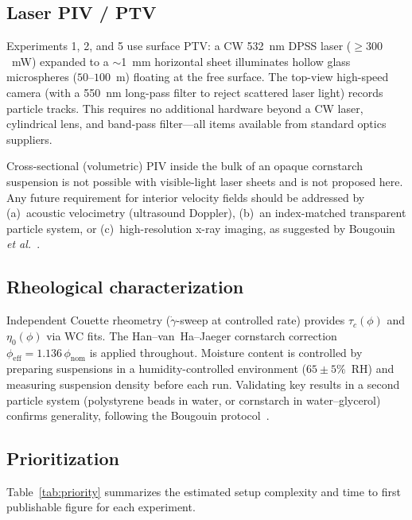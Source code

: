 \documentclass[aps,preprint,superscriptaddress,longbibliography]{revtex4-2}
\newcommand{\tauc}{\tau_c}
\newcommand{\etaz}{\eta_0}
\begin{document}
\subsection{Laser PIV / PTV}

Experiments 1, 2, and 5 use surface PTV: a CW 532~nm DPSS laser
($\geq 300$~mW) expanded to a $\sim$1~mm horizontal sheet illuminates hollow
glass microspheres ($50$--$100$~\textmu m) floating at the free surface.  The
top-view high-speed camera (with a 550~nm long-pass filter to reject scattered
laser light) records particle tracks.  This requires no additional hardware
beyond a CW laser, cylindrical lens, and band-pass filter---all items available
from standard optics suppliers.

Cross-sectional (volumetric) PIV inside the bulk of an opaque cornstarch
suspension is not possible with visible-light laser sheets and is not proposed
here.  Any future requirement for interior velocity fields should be addressed
by (a)~acoustic velocimetry (ultrasound Doppler), (b)~an index-matched
transparent particle system, or (c)~high-resolution x-ray imaging, as
suggested by Bougouin \textit{et al.}~\cite{Bougouin2026PRL}.

\subsection{Rheological characterization}

Independent Couette rheometry ($\dot{\gamma}$-sweep at controlled rate)
provides $\tauc(\phi)$ and $\etaz(\phi)$ via WC fits.  The Han--van~Ha--Jaeger
cornstarch correction $\phi_\text{eff} = 1.136\,\phi_\text{nom}$
\cite{HanVanHaJaeger2017} is applied throughout.  Moisture content is
controlled by preparing suspensions in a humidity-controlled environment
($65 \pm 5\%$~RH) and measuring suspension density before each run.  Validating
key results in a second particle system (polystyrene beads in water, or
cornstarch in water--glycerol) confirms generality, following the Bougouin
protocol~\cite{Bougouin2026PRL}.

\subsection{Prioritization}

Table~\ref{tab:priority} summarizes the estimated setup complexity and time to
first publishable figure for each experiment.
\end{document}
